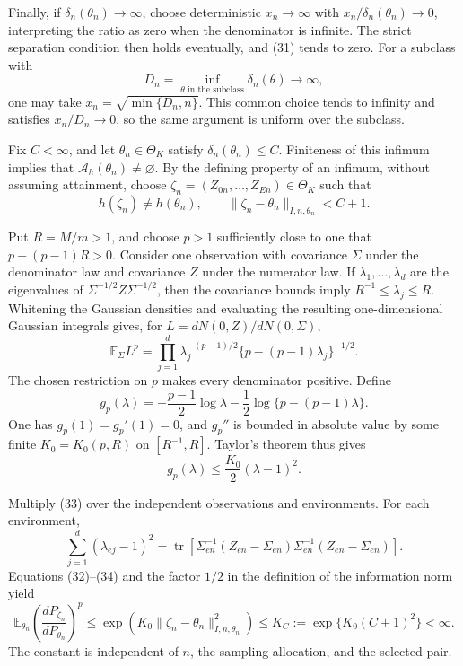 Finally, if \(\delta_n(\theta_n)\to\infty\), choose deterministic \(x_n\to\infty\) with \(x_n/\delta_n(\theta_n)\to0\), interpreting the ratio as zero when the denominator is infinite.  The strict separation condition then holds eventually, and (31) tends to zero.  For a subclass with
\[
 D_n=\inf_{\theta\text{ in the subclass}}\delta_n(\theta)\longrightarrow\infty,
\]
one may take \(x_n=\sqrt{\min\{D_n,n\}}\).  This common choice tends to infinity and satisfies \(x_n/D_n\to0\), so the same argument is uniform over the subclass.

Fix \(C<\infty\), and let \(\theta_n\in\Theta_K\) satisfy \(\delta_n(\theta_n)\le C\).  Finiteness of this infimum implies that \(\mathcal A_h(\theta_n)\ne\varnothing\).  By the defining property of an infimum, without assuming attainment, choose \(\zeta_n=(Z_{0n},\ldots,Z_{En})\in\Theta_K\) such that
\[
 h(\zeta_n)\ne h(\theta_n),
 \qquad
 \lVert\zeta_n-\theta_n\rVert_{I,n,\theta_n}<C+1. \tag{32}
\]

Put \(R=M/m>1\), and choose \(p>1\) sufficiently close to one that
\(p-(p-1)R>0\).  Consider one observation with covariance \(\Sigma\) under the denominator law and covariance \(Z\) under the numerator law.  If \(\lambda_1,\ldots,\lambda_d\) are the eigenvalues of \(\Sigma^{-1/2}Z\Sigma^{-1/2}\), then the covariance bounds imply \(R^{-1}\le\lambda_j\le R\).  Whitening the Gaussian densities and evaluating the resulting one-dimensional Gaussian integrals gives, for \(L=dN(0,Z)/dN(0,\Sigma)\),
\[
 \mathbb E_\Sigma L^p
 =\prod_{j=1}^d
 \lambda_j^{-(p-1)/2}\{p-(p-1)\lambda_j\}^{-1/2}. \tag{33}
\]
The chosen restriction on \(p\) makes every denominator positive.  Define
\[
 g_p(\lambda)=-\frac{p-1}{2}\log\lambda
 -\frac12\log\{p-(p-1)\lambda\}.
\]
One has \(g_p(1)=g_p'(1)=0\), and \(g_p''\) is bounded in absolute value by some finite \(K_0=K_0(p,R)\) on \([R^{-1},R]\).  Taylor's theorem thus gives
\[
 g_p(\lambda)\le\frac{K_0}{2}(\lambda-1)^2. \tag{34}
\]

Multiply (33) over the independent observations and environments.  For each environment,
\[
 \sum_{j=1}^d(\lambda_{ej}-1)^2
 =\operatorname{tr}\!\left[
 \Sigma_{en}^{-1}(Z_{en}-\Sigma_{en})
 \Sigma_{en}^{-1}(Z_{en}-\Sigma_{en})\right].
\]
Equations (32)--(34) and the factor \(1/2\) in the definition of the information norm yield
\[
 \mathbb E_{\theta_n}\left(\frac{dP_{\zeta_n}}{dP_{\theta_n}}\right)^p
 \le \exp\!\left(K_0\lVert\zeta_n-\theta_n\rVert_{I,n,\theta_n}^2\right)
 \le K_C:=\exp\{K_0(C+1)^2\}<\infty. \tag{35}
\]
The constant is independent of \(n\), the sampling allocation, and the selected pair.

